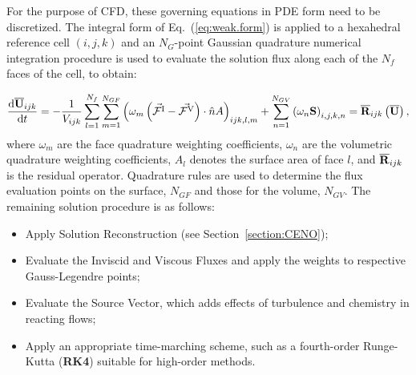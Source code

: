 For the purpose of CFD, these governing equations in PDE form need to be discretized. The integral form of Eq.~(\ref{eq:weak.form}) is applied to a hexahedral reference cell $(i,j,k)$ and an $N_G$-point Gaussian quadrature numerical integration procedure is used to evaluate the solution flux along each of the $N_f$ faces of the cell, to obtain:

\begin{equation}
\label{eqn:semi_discrete}
 \frac{\mathrm{d}\overline{\mathbf{U}}_{ijk}}{\mathrm{d}t} =
 - \frac{1}{{V}_{ijk}} \sum_{l=1}^{N_f} 
 \sum_{m=1}^{N_{GF}} \left( \omega_m \left(\vec{\mathcal{F}^{\mathrm{I}}} - 
 \vec{\mathcal{F}^{\mathrm{V}}} \right)\cdot \hat{n} {A} \right)_{ijk,l,m}
 + \sum_{n=1}^{N_{GV}} \left( \omega_n {\mathbf{S}} \right)_{i,j,k,n}
 = \overline{\mathbf{R}}_{ijk} \left( \overline{\mathbf{U}} \right),
\end{equation}
where $\omega_m$ are the face quadrature weighting coefficients, $\omega_n$ are the volumetric quadrature weighting coefficients, $A_l$ denotes the surface area of face $l$, and $\overline{\mathbf{R}}_{ijk}$ is the residual operator. Quadrature rules are used to determine the flux evaluation points on the surface, $N_{GF}$ and those for the volume, $N_{GV}$. The remaining solution procedure is as follows:
\begin{itemize}
\setlength\itemsep{0.1em}
 \item Apply Solution Reconstruction (see Section~\ref{section:CENO});
 \item Evaluate the Inviscid and Viscous Fluxes and apply the weights to respective Gauss-Legendre points;
 \item Evaluate the Source Vector, which adds effects of turbulence and chemistry in reacting flows;
 \item Apply an appropriate time-marching scheme, such as a fourth-order Runge-Kutta (\textbf{RK4}) suitable for high-order methods.
\end{itemize}

